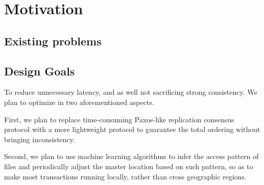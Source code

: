 \section{Motivation}

\subsection{Existing problems}


\subsection{Design Goals}
To reduce unnecessary latency, and as well not sacrificing strong consistency. We plan to optimize in two aforementioned aspects. 

First, we plan to replace time-consuming Paxos-like replication consensus protocol with a more lightweight protocol to guarantee the total ordering without bringing inconsistency.

Second, we plan to use machine learning algorithms to infer the access pattern of files and periodically adjust the master location based on such pattern, so as to make most transactions running locally, rather than cross geographic regions.